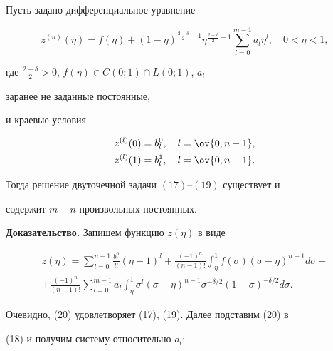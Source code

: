 \begin{lemnonum} 


Пусть задано дифференциальное уравнение 


\begin{equation} 


z^{(n)}(\eta)=f(\eta)+(1-\eta)^{\frac{2-\delta}{2}-1} 


\eta^{\frac{2-\delta}{2}-1}\sum^{m-1}_{l=0}a_l \eta^l,\quad 0<\eta<1, 


\end{equation} 


где $\frac{2-\delta}{2}>0$, $f(\eta)\in C(0;1)\cap L(0;1)$, $a_l$ --- 


заранее не заданные постоянные, 


и краевые условия 


\begin{align} 


z^{(l)}(0)&=b^0_l, \quad l=\ov{0,n-1}, \\ 


z^{(l)}(1)&=b^1_l,\quad l=\ov{0,n-1}. 


\end{align} 


Тогда решение двуточечной задачи $(17)$--$(19)$ существует и 


содержит $m-n$ произвольных постоянных. 


\end{lemnonum} 


 


{\bf Доказательство.} Запишем функцию $z(\eta)$ в виде 


\begin{multline} 


z(\eta)=\sum^{n-1}_{l=0}\frac{b^0_l}{l!}(\eta-1)^l+ 


\frac{(-1)^n}{(n-1)!}\int^1_\eta f(\sigma) 


(\sigma-\eta)^{n-1}d\sigma+ \\ +


\frac{(-1)^n}{(n-1)!}\sum^{m-1}_{l=0}a_l \int^1_\eta 


\sigma^l (\sigma-\eta)^{n-1}\sigma^{-\delta/2} 


(1-\sigma)^{-\delta/2}d\sigma. 


\end{multline} 


Очевидно, (20) удовлетворяет (17), (19). Далее подставим (20) в 


(18) и получим систему относительно $a_l$: 


